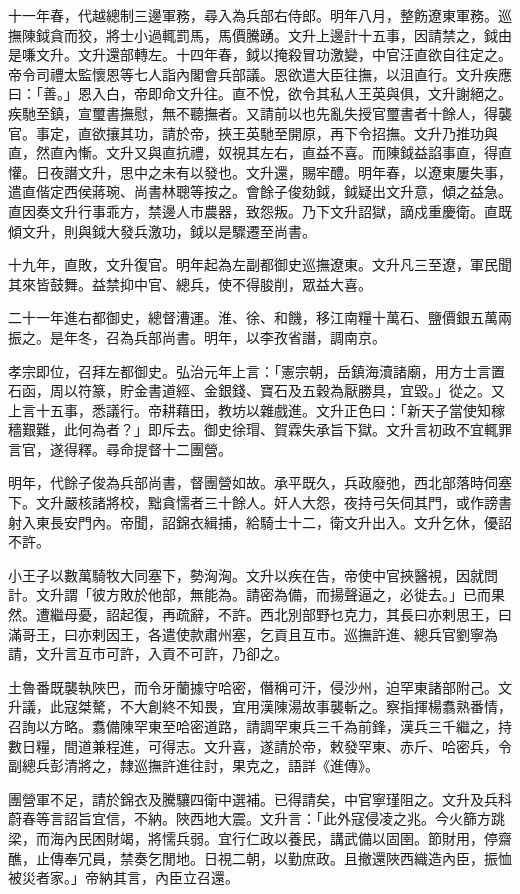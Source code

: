\begin{pinyinscope}
十一年春，代越總制三邊軍務，尋入為兵部右侍郎。明年八月，整飭遼東軍務。巡撫陳鉞貪而狡，將士小過輒罰馬，馬價騰踴。文升上邊計十五事，因請禁之，鉞由是嗛文升。文升還部轉左。十四年春，鉞以掩殺冒功激變，中官汪直欲自往定之。帝令司禮太監懷恩等七人詣內閣會兵部議。恩欲遣大臣往撫，以沮直行。文升疾應曰：「善。」恩入白，帝即命文升往。直不悅，欲令其私人王英與俱，文升謝絕之。疾馳至鎮，宣璽書撫慰，無不聽撫者。又請前以也先亂失授官璽書者十餘人，得襲官。事定，直欲攘其功，請於帝，挾王英馳至開原，再下令招撫。文升乃推功與直，然直內慚。文升又與直抗禮，奴視其左右，直益不喜。而陳鉞益諂事直，得直懽。日夜譖文升，思中之未有以發也。文升還，賜牢醴。明年春，以遼東屢失事，遣直偕定西侯蔣琬、尚書林聰等按之。會餘子俊劾鉞，鉞疑出文升意，傾之益急。直因奏文升行事乖方，禁邊人市農器，致怨叛。乃下文升詔獄，謫戍重慶衛。直既傾文升，則與鉞大發兵激功，鉞以是驟遷至尚書。

十九年，直敗，文升復官。明年起為左副都御史巡撫遼東。文升凡三至遼，軍民聞其來皆鼓舞。益禁抑中官、總兵，使不得朘削，眾益大喜。

二十一年進右都御史，總督漕運。淮、徐、和饑，移江南糧十萬石、鹽價銀五萬兩振之。是年冬，召為兵部尚書。明年，以李孜省譖，調南京。

孝宗即位，召拜左都御史。弘治元年上言：「憲宗朝，岳鎮海瀆諸廟，用方士言置石函，周以符篆，貯金書道經、金銀錢、寶石及五穀為厭勝具，宜毀。」從之。又上言十五事，悉議行。帝耕藉田，教坊以雜戲進。文升正色曰：「新天子當使知稼穡艱難，此何為者？」即斥去。御史徐瑁、賀霖失承旨下獄。文升言初政不宜輒罪言官，遂得釋。尋命提督十二團營。

明年，代餘子俊為兵部尚書，督團營如故。承平既久，兵政廢弛，西北部落時伺塞下。文升嚴核諸將校，黜貪懦者三十餘人。奸人大怨，夜持弓矢伺其門，或作謗書射入東長安門內。帝聞，詔錦衣緝捕，給騎士十二，衛文升出入。文升乞休，優詔不許。

小王子以數萬騎牧大同塞下，勢洶洶。文升以疾在告，帝使中官挾醫視，因就問計。文升謂「彼方敗於他部，無能為。請密為備，而揚聲逼之，必徙去。」已而果然。遭繼母憂，詔起復，再疏辭，不許。西北別部野乜克力，其長曰亦剌思王，曰滿哥王，曰亦剌因王，各遣使款肅州塞，乞貢且互市。巡撫許進、總兵官劉寧為請，文升言互市可許，入貢不可許，乃卻之。

土魯番既襲執陜巴，而令牙蘭據守哈密，僭稱可汗，侵沙州，迫罕東諸部附己。文升議，此寇桀驁，不大創終不知畏，宜用漢陳湯故事襲斬之。察指揮楊翥熟番情，召詢以方略。翥備陳罕東至哈密道路，請調罕東兵三千為前鋒，漢兵三千繼之，持數日糧，間道兼程進，可得志。文升喜，遂請於帝，敕發罕東、赤斤、哈密兵，令副總兵彭清將之，隸巡撫許進往討，果克之，語詳《進傳》。

團營軍不足，請於錦衣及騰驤四衛中選補。已得請矣，中官寧瑾阻之。文升及兵科蔚春等言詔旨宜信，不納。陜西地大震。文升言：「此外寇侵凌之兆。今火篩方跳梁，而海內民困財竭，將懦兵弱。宜行仁政以養民，講武備以固圉。節財用，停齋醮，止傳奉冗員，禁奏乞閒地。日視二朝，以勤庶政。且撤還陜西織造內臣，振恤被災者家。」帝納其言，內臣立召還。


\end{pinyinscope}
